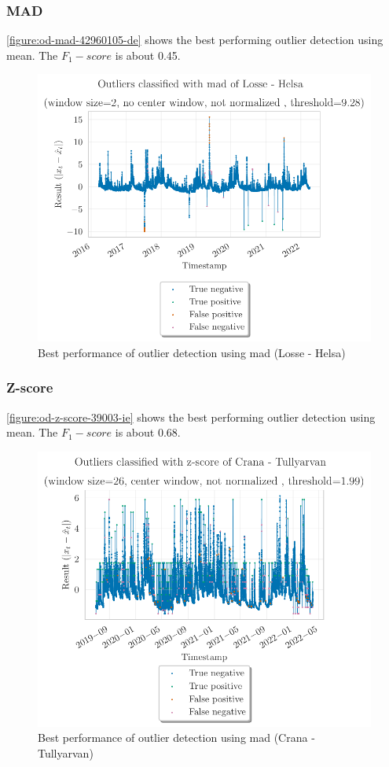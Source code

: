\subsubsection{MAD}
\autoref{figure:od-mad-42960105-de} shows the best performing outlier detection using mean. The $F_1-score$ is about 0.45. %
\begin{figure}[htp]
    \centering 
    \includegraphics{plots/pdfs/42960105-de/od_mad_42960105-de_all.pdf}
    \caption{Best performance of outlier detection using mad (Losse - Helsa)}
    \label{figure:od-mad-42960105-de}
\end{figure}

\subsubsection{Z-score}
\autoref{figure:od-z-score-39003-ie} shows the best performing outlier detection using mean. The $F_1-score$ is about 0.68. %
\begin{figure}[htp]
    \centering 
    \includegraphics{plots/pdfs/39003-ie/od_z-score_39003-ie_all.pdf}
    \caption{Best performance of outlier detection using mad (Crana - Tullyarvan)}
    \label{figure:od-z-score-39003-ie}
\end{figure}

